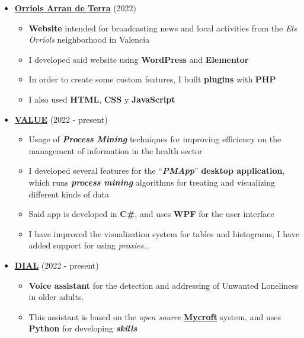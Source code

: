 \documentclass[letterpaper, 12pt, dvipsnames]{article}
\begin{document}
\vspace{1em}

\begin{itemize}
    \item {\large\textbf{\href{https://orriolsarrandeterra.com/}{Orriols Arran de Terra}}} (2022)
          \begin{itemize}
              \item \textbf{Website} intended for broadcasting news and local activities from the \emph{Els Orriols} neighborhood in Valencia
              \item I developed said website using \textbf{WordPress} and \textbf{Elementor}
              \item In order to create some custom features, I built \textbf{plugins} with \textbf{PHP}
              \item I also used \textbf{HTML}, \textbf{CSS} y \textbf{JavaScript}
          \end{itemize}
    \item {\large\textbf{\href{https://www.sabien.upv.es/project/value/}{VALUE}}} (2022 - present)
          \begin{itemize}
              \item Usage of \textbf{\emph{Process Mining}} techniques for improving efficiency on the management of information in the health sector
              \item I developed several features for the ``\textbf{\emph{PMApp}}'' \textbf{desktop application}, which runs \textbf{\emph{process mining}} algorithms for treating and visualizing different kinds of data
              \item Said app is developed in \textbf{C\#}, and uses \textbf{WPF} for the user interface
              \item I have improved the visualization system for tables and histograms, I have added support for using \emph{proxies}\dots
          \end{itemize}
    \item {\large\textbf{\href{http://www.sabien.upv.es/project/dial/}{DIAL}}} (2022 - present)
          \begin{itemize}
              \item \textbf{Voice assistant} for the detection and addressing of Unwanted Loneliness in older adults.
              \item This assistant is based on the \emph{open source} \textbf{\href{https://mycroft.ai/}{Mycroft}} system, and uses \textbf{Python} for developing \textbf{\emph{skills}}

\end{itemize}
\end{itemize}
\end{document}
